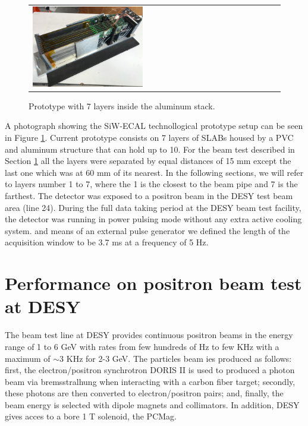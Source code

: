 \documentclass[final,3p,times,twocolumn]{elsarticle}
\begin{document}
\begin{figure}[!t]
\centering
\begin{tabular}{l}
\includegraphics[width=0.45\textwidth]{../figs/proto.png} 
\end{tabular}
\caption{Prototype with 7 layers inside the aluminum stack.}
\label{proto}
\end{figure}

A photograph showing the SiW-ECAL technollogical prototype setup can be seen in Figure \ref{proto}.
Current prototype consists on 7 layers of SLABs housed by a PVC and aluminum structure that can hold up to 10.
For the beam test described in Section \ref{sec:beamtest} all the layers were separated by equal distances of 15 mm
except the last one which was at 60 mm of its nearest. In the following sections, we will refer to layers number 1 to 7, where
the 1 is the closest to the beam pipe and 7 is the farthest.
The detector was exposed to a positron beam in the DESY test beam area (line 24).
During the full data taking period at the DESY beam test facility,
the detector was running in power pulsing mode without any extra active cooling system.
and means of an external pulse generator we defined the length of the acquisition window to be
3.7 ms at a frequency of 5 Hz.

\section{Performance on positron beam test at DESY}
\label{sec:beamtest}

The beam test line at DESY provides continuous positron beams in the energy range of 1 to 6 GeV with
rates from few hundreds of Hz to few KHz with a maximum of $\sim 3$ KHz for 2-3 GeV. 
The particles beam ies produced as follows: first, the electron/positron synchrotron DORIS II 
is used to produced a photon beam via bremsstralhung when interacting with a carbon fiber target;
secondly, these photons are then converted to electron/positron pairs; 
and, finally, the beam energy is selected with dipole magnets and collimators. 
In addition, DESY gives acces to a bore 1 T solenoid, the PCMag.
\end{document}
